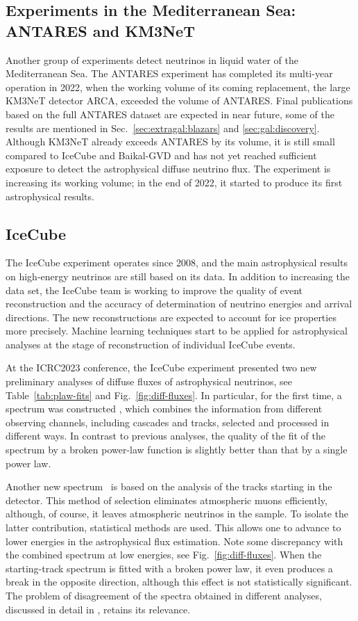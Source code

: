 \documentclass[a4paper,noshowpacs,noshowkeys,floatfix,twocolumn,preprintnumbers,nofootinbib]{revtex4-2}
\begin{document}
\subsection{Experiments in the Mediterranean Sea: ANTARES and
KM3NeT}
\label{sec:exp:Mediterranean}
Another group of experiments detect neutrinos in liquid water
of the Mediterranean Sea. The ANTARES experiment has completed its multi-year operation in 2022, when the working volume of its coming replacement, the large KM3NeT detector ARCA, exceeded the volume of ANTARES. Final publications based on the full ANTARES dataset are expected in near future, some of the results are mentioned in Sec.~\ref{sec:extragal:blazars} and \ref{sec:gal:discovery}. Although KM3NeT already exceeds ANTARES by its volume, it is still small compared to IceCube and Baikal-GVD and has not yet reached sufficient exposure to detect the astrophysical diffuse neutrino flux. The experiment is increasing its working volume; in the end of 2022, it started to produce its first astrophysical results.

\subsection{IceCube}
\label{sec:exp:IceCube}
The IceCube experiment operates since 2008, and the main astrophysical results on high-energy neutrinos are still based on its data. In addition to increasing the data set, the IceCube team is working to improve the quality of event reconstruction and the accuracy of determination of neutrino energies and arrival directions. The new reconstructions are expected to account for ice properties more precisely. Machine learning techniques start to be applied for astrophysical analyses at the stage of reconstruction of individual IceCube events.

At the ICRC2023 conference, the IceCube experiment presented two new preliminary analyses of diffuse fluxes of astrophysical neutrinos, see Table~\ref{tab:plaw-fits} and Fig.~\ref{fig:diff-fluxes}. In particular, for the first time, a spectrum was constructed \cite{IceCube-ICRC2023-combined}, which combines the information from different observing channels, including cascades and tracks, selected and processed in different ways. In contrast to previous analyses, the quality of the fit of the spectrum by a broken power-law function is slightly better than that by a single power law.

Another new spectrum~\cite{IceCube-ICRC2023-starting} is based on the analysis of the tracks starting in the detector. This method of selection eliminates atmospheric muons efficiently, although, of course, it leaves atmospheric neutrinos in the sample. To isolate the latter contribution, statistical methods are used. This allows one to advance to lower energies in the astrophysical flux estimation. Note some discrepancy with the combined spectrum at low energies, see Fig.~\ref{fig:diff-fluxes}. When the starting-track spectrum is fitted with a broken power law, it even produces a break in the opposite direction, although this effect is not statistically significant. The problem of disagreement of the spectra obtained in different analyses, discussed in detail in \cite{ST-UFN}, retains its relevance.
\end{document}
